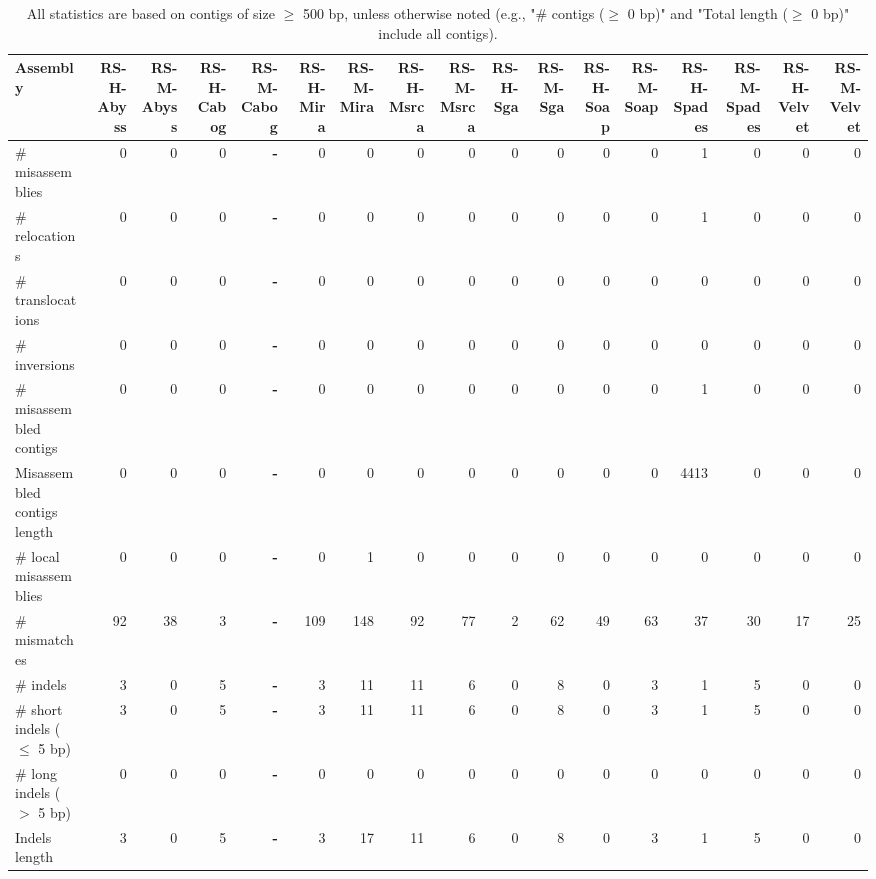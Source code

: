 \documentclass[12pt,a4paper]{article}
\begin{document}
\begin{table}[ht]
\begin{center}
\caption{All statistics are based on contigs of size $\geq$ 500 bp, unless otherwise noted (e.g., "\# contigs ($\geq$ 0 bp)" and "Total length ($\geq$ 0 bp)" include all contigs).}
\begin{tabular}{|l*{16}{|r}|}
\hline
Assembly & RS-H-Abyss & RS-M-Abyss & RS-H-Cabog & RS-M-Cabog & RS-H-Mira & RS-M-Mira & RS-H-Msrca & RS-M-Msrca & RS-H-Sga & RS-M-Sga & RS-H-Soap & RS-M-Soap & RS-H-Spades & RS-M-Spades & RS-H-Velvet & RS-M-Velvet \\ \hline
\# misassemblies & 0 & 0 & 0 & {\bf -} & 0 & 0 & 0 & 0 & 0 & 0 & 0 & 0 & 1 & 0 & 0 & 0 \\ \hline
\hspace{5mm}\# relocations & 0 & 0 & 0 & {\bf -} & 0 & 0 & 0 & 0 & 0 & 0 & 0 & 0 & 1 & 0 & 0 & 0 \\ \hline
\hspace{5mm}\# translocations & 0 & 0 & 0 & {\bf -} & 0 & 0 & 0 & 0 & 0 & 0 & 0 & 0 & 0 & 0 & 0 & 0 \\ \hline
\hspace{5mm}\# inversions & 0 & 0 & 0 & {\bf -} & 0 & 0 & 0 & 0 & 0 & 0 & 0 & 0 & 0 & 0 & 0 & 0 \\ \hline
\# misassembled contigs & 0 & 0 & 0 & {\bf -} & 0 & 0 & 0 & 0 & 0 & 0 & 0 & 0 & 1 & 0 & 0 & 0 \\ \hline
Misassembled contigs length & 0 & 0 & 0 & {\bf -} & 0 & 0 & 0 & 0 & 0 & 0 & 0 & 0 & 4413 & 0 & 0 & 0 \\ \hline
\# local misassemblies & 0 & 0 & 0 & {\bf -} & 0 & 1 & 0 & 0 & 0 & 0 & 0 & 0 & 0 & 0 & 0 & 0 \\ \hline
\# mismatches & 92 & 38 & 3 & {\bf -} & 109 & 148 & 92 & 77 & 2 & 62 & 49 & 63 & 37 & 30 & 17 & 25 \\ \hline
\# indels & 3 & 0 & 5 & {\bf -} & 3 & 11 & 11 & 6 & 0 & 8 & 0 & 3 & 1 & 5 & 0 & 0 \\ \hline
\hspace{5mm}\# short indels ($\leq$ 5 bp) & 3 & 0 & 5 & {\bf -} & 3 & 11 & 11 & 6 & 0 & 8 & 0 & 3 & 1 & 5 & 0 & 0 \\ \hline
\hspace{5mm}\# long indels ($>$ 5 bp) & 0 & 0 & 0 & {\bf -} & 0 & 0 & 0 & 0 & 0 & 0 & 0 & 0 & 0 & 0 & 0 & 0 \\ \hline
Indels length & 3 & 0 & 5 & {\bf -} & 3 & 17 & 11 & 6 & 0 & 8 & 0 & 3 & 1 & 5 & 0 & 0 \\ \hline
\end{tabular}
\end{center}
\end{table}
\end{document}
